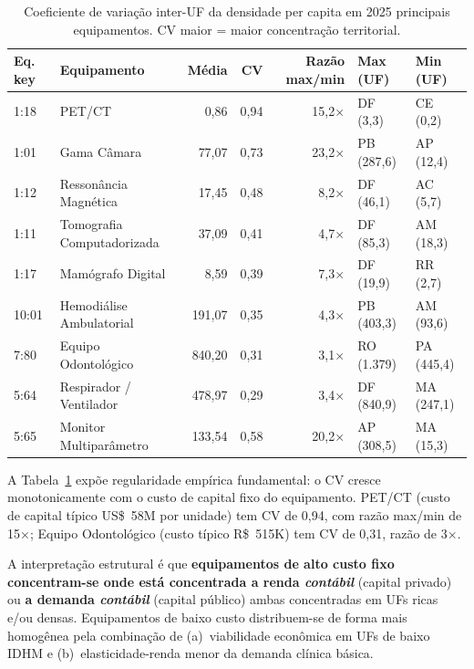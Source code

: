 \documentclass[12pt,a4paper,oneside]{article}
\begin{document}
\begin{table}[htbp]
\centering
\caption{Coeficiente de variação inter-UF da densidade per capita
em 2025 \textemdash{} principais equipamentos. CV maior = maior
concentração territorial.}
\label{tab:cv-equipamentos}
\small
\begin{tabular}{l l r r r l l}
\toprule
\textbf{Eq. key} & \textbf{Equipamento} & \textbf{Média} &
\textbf{CV} & \textbf{Razão max/min} & \textbf{Max (UF)} & \textbf{Min (UF)} \\
\midrule
1{:}18  & PET/CT                       &   0,86 & 0,94 & 15,2$\times$ & DF (3,3)    & CE (0,2)   \\
1{:}01  & Gama Câmara                  &  77,07 & 0,73 & 23,2$\times$ & PB (287,6)  & AP (12,4)  \\
1{:}12  & Ressonância Magnética        &  17,45 & 0,48 &  8,2$\times$ & DF (46,1)   & AC (5,7)   \\
1{:}11  & Tomografia Computadorizada   &  37,09 & 0,41 &  4,7$\times$ & DF (85,3)   & AM (18,3)  \\
1{:}17  & Mamógrafo Digital            &   8,59 & 0,39 &  7,3$\times$ & DF (19,9)   & RR (2,7)   \\
10{:}01 & Hemodiálise Ambulatorial     & 191,07 & 0,35 &  4,3$\times$ & PB (403,3)  & AM (93,6)  \\
7{:}80  & Equipo Odontológico          & 840,20 & 0,31 &  3,1$\times$ & RO (1.379)  & PA (445,4) \\
5{:}64  & Respirador / Ventilador      & 478,97 & 0,29 &  3,4$\times$ & DF (840,9)  & MA (247,1) \\
5{:}65  & Monitor Multiparâmetro       & 133,54 & 0,58 & 20,2$\times$ & AP (308,5)  & MA (15,3)  \\
\bottomrule
\end{tabular}
\end{table}

A Tabela~\ref{tab:cv-equipamentos} expõe regularidade empírica
fundamental: o CV cresce monotonicamente com o custo de capital
fixo do equipamento. PET/CT (custo de capital típico US\$~5\textendash 8M
por unidade) tem CV de 0,94, com razão max/min de 15$\times$;
Equipo Odontológico (custo típico R\$~5\textendash 15K) tem CV de
0,31, razão de 3$\times$.

A interpretação estrutural é que \textbf{equipamentos de alto custo
fixo concentram-se onde está concentrada a renda \textit{contábil}}
(capital privado) ou \textbf{a demanda \textit{contábil}} (capital
público) \textemdash{} ambas concentradas em UFs ricas e/ou
densas. Equipamentos de baixo custo distribuem-se de forma mais
homogênea pela combinação de (a)~viabilidade econômica em UFs
de baixo IDHM e (b)~elasticidade-renda menor da demanda
clínica básica.
\end{document}
